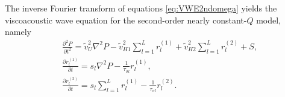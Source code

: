\documentclass[article]{./macros/elsarticle_qh}
\begin{document}
The inverse Fourier transform of equations \ref{eq:VWE2ndomega} yields the viscoacoustic wave equation for the second-order nearly constant-$Q$ model, namely
\begin{equation}
\begin{split}
& \frac{\partial^2 P}{\partial t^2} = \tilde{v}_{U}^2 \nabla^2 P
- \tilde{v}_{H1}^2 \sum_{l=1}^{L} r_{l}^{(1)} 
+ \tilde{v}_{H2}^2 \sum_{l=1}^{L} r_{l}^{(2)} 
+ S , \\
& \frac{\partial r_{l}^{(1)}}{\partial t} = s_{l} \nabla^2 P
- \frac{1}{\tau_{\sigma l}} r_{l}^{(1)} , \\
& \frac{\partial r_{l}^{(2)}}{\partial t} = s_{l} \sum_{l=1}^{L} r_{l}^{(1)} 
- \frac{1}{\tau_{\sigma l}} r_{l}^{(2)} .
\end{split}
\end{equation}



\end{document}
